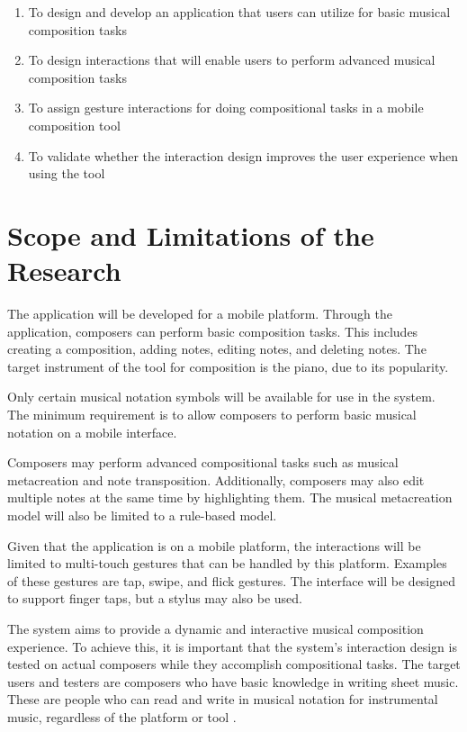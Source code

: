 \begin{enumerate}
	\item To design and develop an application that users can utilize for basic musical composition tasks
    \item To design interactions that will enable users to perform advanced musical composition tasks
    \item To assign gesture interactions for doing compositional tasks in a mobile composition tool
    \item To validate whether the interaction design improves the user experience when using the tool

\end{enumerate}

\section{Scope and Limitations of the Research}
\label{sec:scopelimitations}

The application will be developed for a mobile platform. Through the application, composers can perform basic composition tasks. This includes creating a composition, adding notes, editing notes, and deleting notes. The target instrument of the tool for composition is the piano, due to its popularity.

Only certain musical notation symbols will be available for use in the system. The minimum requirement is to allow composers to perform basic musical notation on a mobile interface.

Composers may perform advanced compositional tasks such as musical metacreation and note transposition. Additionally, composers may also edit multiple notes at the same time by highlighting them. The musical metacreation model will also be limited to a rule-based model.

Given that the application is on a mobile platform, the interactions will be limited to multi-touch gestures that can be handled by this platform. Examples of these gestures are tap, swipe, and flick gestures. The interface will be designed to support finger taps, but a stylus may also be used.

The system aims to provide a dynamic and interactive musical composition experience. To achieve this, it is important that the system's interaction design is tested on actual composers while they accomplish compositional tasks. The target users and testers are composers who have basic knowledge in writing sheet music. These are people who can read and write in musical notation for instrumental music, regardless of the platform or tool	.

